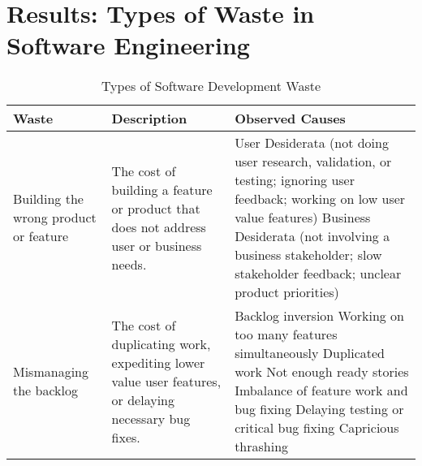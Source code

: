 \section{Results: Types of Waste in Software Engineering}
\label{SEWaste}


\begin{table*}[t]
\renewcommand{\arraystretch}{1.3}
\centering
\caption{Types of Software Development Waste}
\label{Waste}
\begin{tabular}{|p{1.7in}|p{1.9in}|p{3in}|}
\hline
Waste  & Description & Observed Causes                                                                                                                                                                                                                                                                                                                                                                                                                     \\ \hline
Building the wrong product or feature &  The cost of building a feature or product that does not address user or business needs. & 
User Desiderata (not doing user research, validation, or testing; ignoring user feedback; working on low user value features) \newline Business Desiderata (not involving a business stakeholder; slow stakeholder feedback; unclear product priorities)                                                                                                                                                                                  \\ \hline
Mismanaging the backlog     & The cost of duplicating work, expediting lower value user features, or delaying necessary bug fixes.  & 
Backlog inversion \newline Working on too many features simultaneously \newline Duplicated work \newline Not enough ready stories  \newline Imbalance of feature work and bug fixing \newline Delaying testing or critical bug fixing \newline Capricious thrashing                                                                                                                                                                                                                                                                                                                                    \\ \hline

\end{tabular}
\end{table*}
